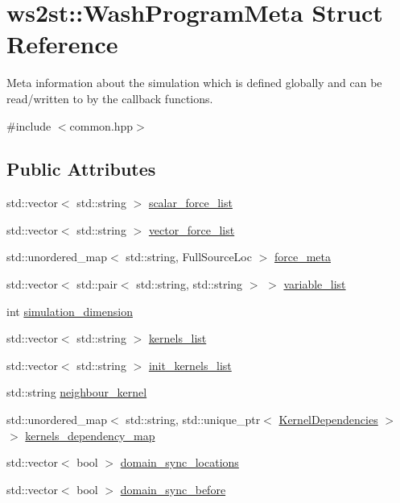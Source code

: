 \hypertarget{structws2st_1_1WashProgramMeta}{}\section{ws2st\+:\+:Wash\+Program\+Meta Struct Reference}
\label{structws2st_1_1WashProgramMeta}


Meta information about the simulation which is defined globally and can be read/written to by the callback functions.  




{\ttfamily \#include $<$common.\+hpp$>$}

\subsection*{Public Attributes}
\begin{DoxyCompactItemize}
\item 
std\+::vector$<$ std\+::string $>$ \mbox{\hyperlink{structws2st_1_1WashProgramMeta_a71dfe0ec3a593707b26a3387d6ffe097}{scalar\+\_\+force\+\_\+list}}
\item 
std\+::vector$<$ std\+::string $>$ \mbox{\hyperlink{structws2st_1_1WashProgramMeta_a4b2ccb325270ac70589972a556b704b5}{vector\+\_\+force\+\_\+list}}
\item 
std\+::unordered\+\_\+map$<$ std\+::string, Full\+Source\+Loc $>$ \mbox{\hyperlink{structws2st_1_1WashProgramMeta_a2769172e26989f7d8759906460bbd43c}{force\+\_\+meta}}
\item 
std\+::vector$<$ std\+::pair$<$ std\+::string, std\+::string $>$ $>$ \mbox{\hyperlink{structws2st_1_1WashProgramMeta_ac42b81ba6becd8cba9834dc903704e5c}{variable\+\_\+list}}
\item 
int \mbox{\hyperlink{structws2st_1_1WashProgramMeta_a3a521dc326a6070a0af9c4bbec3913f4}{simulation\+\_\+dimension}}
\item 
std\+::vector$<$ std\+::string $>$ \mbox{\hyperlink{structws2st_1_1WashProgramMeta_ae19b95e2db30a6d8b366b1c9965b4806}{kernels\+\_\+list}}
\item 
std\+::vector$<$ std\+::string $>$ \mbox{\hyperlink{structws2st_1_1WashProgramMeta_a36d24273393b878a32f470aff4cd837f}{init\+\_\+kernels\+\_\+list}}
\item 
std\+::string \mbox{\hyperlink{structws2st_1_1WashProgramMeta_ab8b551d40c83ad55f84610e7041972cd}{neighbour\+\_\+kernel}}
\item 
std\+::unordered\+\_\+map$<$ std\+::string, std\+::unique\+\_\+ptr$<$ \mbox{\hyperlink{structws2st_1_1KernelDependencies}{Kernel\+Dependencies}} $>$ $>$ \mbox{\hyperlink{structws2st_1_1WashProgramMeta_a3f60907c890b351559afda6420edf367}{kernels\+\_\+dependency\+\_\+map}}
\item 
std\+::vector$<$ bool $>$ \mbox{\hyperlink{structws2st_1_1WashProgramMeta_aa6a9a7afafcc71c0e39e87b6af2216a1}{domain\+\_\+sync\+\_\+locations}}
\item 
std\+::vector$<$ bool $>$ \mbox{\hyperlink{structws2st_1_1WashProgramMeta_a43cc6c30c364f4b03c79189998368ad4}{domain\+\_\+sync\+\_\+before}}
\end{DoxyCompactItemize}


